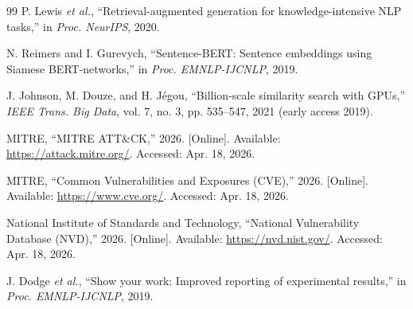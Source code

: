 \begin{thebibliography}{99}
P. Lewis \emph{et al.}, ``Retrieval-augmented generation for knowledge-intensive NLP tasks,'' in \emph{Proc. NeurIPS}, 2020.

N. Reimers and I. Gurevych, ``Sentence-BERT: Sentence embeddings using Siamese BERT-networks,'' in \emph{Proc. EMNLP-IJCNLP}, 2019.

J. Johnson, M. Douze, and H. J\'egou, ``Billion-scale similarity search with GPUs,'' \emph{IEEE Trans. Big Data}, vol. 7, no. 3, pp. 535--547, 2021 (early access 2019).

MITRE, ``MITRE ATT\&CK,'' 2026. [Online]. Available: \url{https://attack.mitre.org/}. Accessed: Apr. 18, 2026.

MITRE, ``Common Vulnerabilities and Exposures (CVE),'' 2026. [Online]. Available: \url{https://www.cve.org/}. Accessed: Apr. 18, 2026.

National Institute of Standards and Technology, ``National Vulnerability Database (NVD),'' 2026. [Online]. Available: \url{https://nvd.nist.gov/}. Accessed: Apr. 18, 2026.

J. Dodge \emph{et al.}, ``Show your work: Improved reporting of experimental results,'' in \emph{Proc. EMNLP-IJCNLP}, 2019.
\end{thebibliography}
